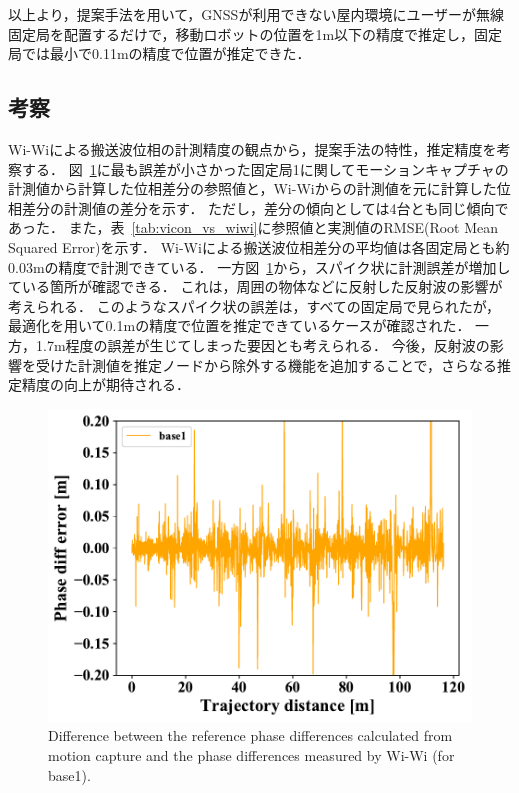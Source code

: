 \documentclass[a4jsme]{jsmepaper}
\newcommand\figref[1]{図~\ref{fig:#1}}
\newcommand\tabref[1]{表~\ref{tab:#1}}
\begin{document}
以上より，提案手法を用いて，GNSSが利用できない屋内環境にユーザーが無線固定局を配置するだけで，移動ロボットの位置を1m以下の精度で推定し，固定局では最小で0.11mの精度で位置が推定できた．

\subsection{考察}
Wi-Wiによる搬送波位相の計測精度の観点から，提案手法の特性，推定精度を考察する．
\figref{vicon_vs_wiwi}に最も誤差が小さかった固定局1に関してモーションキャプチャの計測値から計算した位相差分の参照値と，Wi-Wiからの計測値を元に計算した位相差分の計測値の差分を示す．
ただし，差分の傾向としては4台とも同じ傾向であった．
また，\tabref{vicon_vs_wiwi}に参照値と実測値のRMSE(Root Mean Squared Error)を示す．
Wi-Wiによる搬送波位相差分の平均値は各固定局とも約0.03mの精度で計測できている．
一方\figref{vicon_vs_wiwi}から，スパイク状に計測誤差が増加している箇所が確認できる．
これは，周囲の物体などに反射した反射波の影響が考えられる．
このようなスパイク状の誤差は，すべての固定局で見られたが，最適化を用いて0.1mの精度で位置を推定できているケースが確認された．
一方，1.7m程度の誤差が生じてしまった要因とも考えられる．
今後，反射波の影響を受けた計測値を推定ノードから除外する機能を追加することで，さらなる推定精度の向上が期待される．
\begin{figure}
    \centering
    \includegraphics[width=0.99\linewidth]{figures/robosym_distance_pdm_differences.pdf}
    \caption{Difference between the reference phase differences calculated from motion capture and the phase differences measured by Wi-Wi (for base1).}
    \label{fig:vicon_vs_wiwi}
\end{figure}
\end{document}
